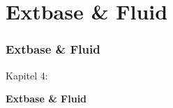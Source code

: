 %

\section{Extbase \& Fluid}
\begin{frame}[fragile]
	\frametitle{Extbase \& Fluid}

	\begin{center}\huge{Kapitel 4:}\end{center}
	\begin{center}\huge{\color{typo3darkgrey}\textbf{Extbase \& Fluid}}\end{center}

\end{frame}


